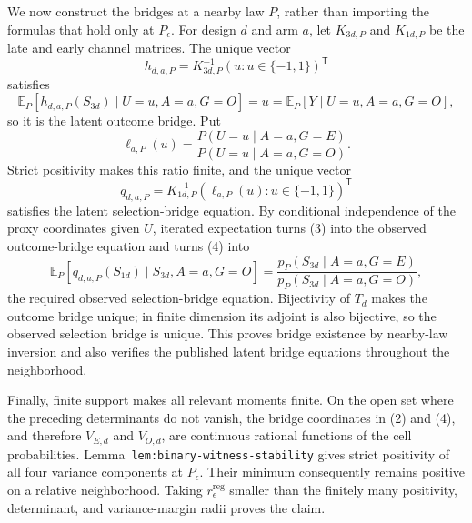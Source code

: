 We now construct the bridges at a nearby law \(P\), rather than importing the formulas that hold only at \(P_\epsilon\).  For design \(d\) and arm \(a\), let \(K_{3d,P}\) and \(K_{1d,P}\) be the late and early channel matrices.  The unique vector
\[
 h_{d,a,P}=K_{3d,P}^{-1}(u:u\in\{-1,1\})^{\mathsf T} \tag{2}
\]
satisfies
\[
 \mathbb E_P[h_{d,a,P}(S_{3d})\mid U=u,A=a,G=O]=u
 =\mathbb E_P[Y\mid U=u,A=a,G=O], \tag{3}
\]
so it is the latent outcome bridge.  Put
\[
 \ell_{a,P}(u)=
 \frac{P(U=u\mid A=a,G=E)}{P(U=u\mid A=a,G=O)}.
\]
Strict positivity makes this ratio finite, and the unique vector
\[
 q_{d,a,P}=K_{1d,P}^{-1}(\ell_{a,P}(u):u\in\{-1,1\})^{\mathsf T} \tag{4}
\]
satisfies the latent selection-bridge equation.  By conditional independence of the proxy coordinates given \(U\), iterated expectation turns (3) into the observed outcome-bridge equation and turns (4) into
\[
 \mathbb E_P[q_{d,a,P}(S_{1d})\mid S_{3d},A=a,G=O]
 =\frac{p_P(S_{3d}\mid A=a,G=E)}{p_P(S_{3d}\mid A=a,G=O)}, \tag{5}
\]
the required observed selection-bridge equation.  Bijectivity of \(T_d\) makes the outcome bridge unique; in finite dimension its adjoint is also bijective, so the observed selection bridge is unique.  This proves bridge existence by nearby-law inversion and also verifies the published latent bridge equations throughout the neighborhood.

Finally, finite support makes all relevant moments finite.  On the open set where the preceding determinants do not vanish, the bridge coordinates in (2) and (4), and therefore \(V_{E,d}\) and \(V_{O,d}\), are continuous rational functions of the cell probabilities.  Lemma~\texttt{lem:binary-witness-stability} gives strict positivity of all four variance components at \(P_\epsilon\).  Their minimum consequently remains positive on a relative neighborhood.  Taking \(r_\epsilon^{\mathrm{reg}}\) smaller than the finitely many positivity, determinant, and variance-margin radii proves the claim.
